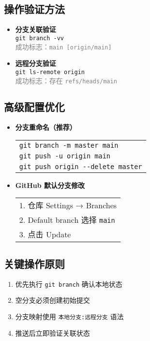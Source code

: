 \subsection{操作验证方法}
\begin{itemize}[leftmargin=*, nosep]
    \item \textbf{分支关联验证} \\
    \texttt{git branch -vv} \\
    \textcolor{gray}{成功标志：\texttt{main [origin/main]}}
    
    \item \textbf{远程分支验证} \\
    \texttt{git ls-remote origin} \\
    \textcolor{gray}{成功标志：存在 \texttt{refs/heads/main}}
\end{itemize}

\subsection{高级配置优化}
\begin{itemize}[leftmargin=*, nosep]
    \item \textbf{分支重命名（推荐）} \\
    \begin{tabular}{@{}l@{}}
        \texttt{git branch -m master main} \\
        \texttt{git push -u origin main} \\
        \texttt{git push origin {-}{-}delete master} \\
    \end{tabular}
    
    \item \textbf{GitHub 默认分支修改} \\
    
\begin{tabular}{@{}l@{}}
        1. 仓库 Settings → Branches \\
        2. Default branch 选择 \texttt{main} \\
        3. 点击 Update \\
    \end{tabular}
\end{itemize}

\subsection{关键操作原则}
\begin{enumerate}[leftmargin=*, nosep]
    \item 优先执行 \texttt{git branch} 确认本地状态
    \item 空分支必须创建初始提交
    \item 分支映射使用 \texttt{本地分支:远程分支} 语法
    \item 推送后立即验证关联状态
\end{enumerate}

